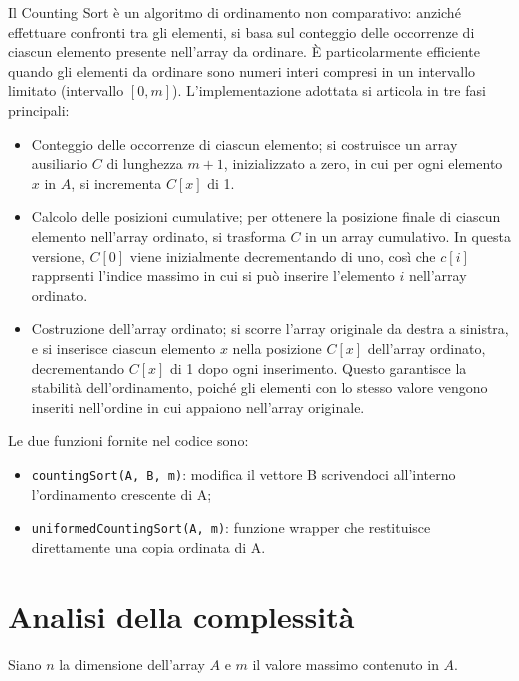 \documentclass[a4paper, 12pt, oneside]{book}
\begin{document}
Il Counting Sort è un algoritmo di ordinamento non comparativo: anziché effettuare confronti tra gli elementi, si basa sul conteggio delle occorrenze di ciascun elemento presente nell'array da ordinare.
È particolarmente efficiente quando gli elementi da ordinare sono numeri interi compresi in un intervallo limitato (intervallo \([0, m]\)).
L'implementazione adottata si articola in tre fasi principali:

\begin{itemize}
    \item Conteggio delle occorrenze di ciascun elemento; si costruisce un array ausiliario \(C\) di lunghezza \(m+1\), inizializzato a zero, in cui per ogni elemento \(x\) in \(A\), si incrementa \(C[x]\) di 1.
    \item Calcolo delle posizioni cumulative; per ottenere la posizione finale di ciascun elemento nell'array ordinato, si trasforma \(C\) in un array cumulativo. In questa versione, \(C[0]\) viene inizialmente decrementando di uno, così che \(c[i]\) rapprsenti l'indice massimo in cui si può inserire l'elemento \(i\) nell'array ordinato.
    \item Costruzione dell'array ordinato; si scorre l'array originale da destra a sinistra, e si inserisce ciascun elemento \(x\) nella posizione \(C[x]\) dell'array ordinato, decrementando \(C[x]\) di 1 dopo ogni inserimento. Questo garantisce la stabilità dell'ordinamento, poiché gli elementi con lo stesso valore vengono inseriti nell'ordine in cui appaiono nell'array originale.
\end{itemize}

\noindent Le due funzioni fornite nel codice sono:

\begin{itemize}
    \item \texttt{countingSort(A, B, m)}: modifica il vettore B scrivendoci all'interno l'ordinamento crescente di A;
    \item \texttt{uniformedCountingSort(A, m)}: funzione wrapper che restituisce direttamente una copia ordinata di A.
\end{itemize}

\section{Analisi della complessità}

Siano \(n\) la dimensione dell'array \(A\) e \(m\) il valore massimo contenuto in \(A\). \\
\end{document}
